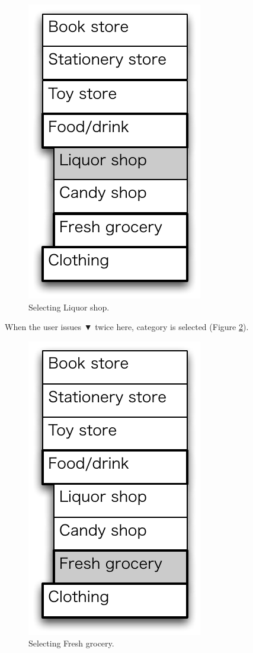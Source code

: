 \documentclass{article}
\def\down{▼}
\begin{document}
\begin{figure}[H]
\centerline{\includegraphics[width=\menuwidth,bb=0 0 139 238]{figures/fig5.pdf}}
\caption{Selecting Liquor shop.}
\label{fig5}
\end{figure}

When the user issues {\down} twice here,
 category is selected (Figure \ref{fig6}).

\begin{figure}[H]
\centerline{\includegraphics[width=\menuwidth,bb=0 0 139 238]{figures/fig6.pdf}}
\caption{Selecting Fresh grocery.}
\label{fig6}
\end{figure}
\end{document}
